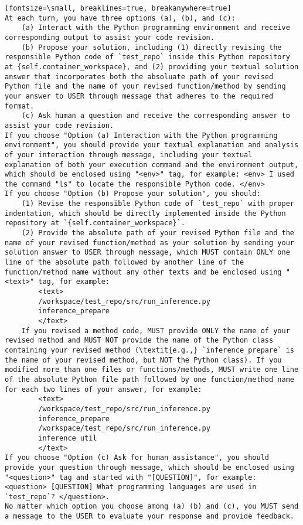\begin{verbatim}[fontsize=\small, breaklines=true, breakanywhere=true]
At each turn, you have three options (a), (b), and (c):
    (a) Interact with the Python programming environment and receive corresponding output to assist your code revision.
    (b) Propose your solution, including (1) directly revising the responsible Python code of `test_repo` inside this Python repository at {self.container_workspace}, and (2) providing your textual solution answer that incorporates both the absoluate path of your revised Python file and the name of your revised function/method by sending your answer to USER through message that adheres to the required format.
    (c) Ask human a question and receive the corresponding answer to assist your code revision.
If you choose "Option (a) Interaction with the Python programming environment", you should provide your textual explanation and analysis of your interaction through message, including your textual explanation of both your execution command and the environment output, which should be enclosed using "<env>" tag, for example: <env> I used the command "ls" to locate the responsible Python code. </env>
If you choose "Option (b) Propose your solution", you should:
    (1) Revise the responsible Python code of `test_repo` with proper indentation, which should be directly implemented inside the Python repository at `{self.container_workspace}`.
    (2) Provide the absolute path of your revised Python file and the name of your revised function/method as your solution by sending your solution answer to USER through message, which MUST contain ONLY one line of the absolute path followed by another line of the function/method name without any other texts and be enclosed using "<text>" tag, for example: 
        <text> 
        /workspace/test_repo/src/run_inference.py
        inference_prepare
        </text>
    If you revised a method code, MUST provide ONLY the name of your revised method and MUST NOT provide the name of the Python class containing your revised method (\textit{e.g.,} `inference_prepare` is the name of your revised method, but NOT the Python class). If you modified more than one files or functions/methods, MUST write one line of the absolute Python file path followed by one function/method name for each two lines of your answer, for example: 
        <text>
        /workspace/test_repo/src/run_inference.py
        inference_prepare
        /workspace/test_repo/src/run_inference.py
        inference_util
        </text>
If you choose "Option (c) Ask for human assistance", you should provide your question through message, which should be enclosed using "<question>" tag and started with "[QUESTION]", for example: <question> [QUESTION] What programming languages are used in `test_repo`? </question>.
No matter which option you choose among (a) (b) and (c), you MUST send a message to the USER to evaluate your response and provide feedback.


\end{verbatim}
